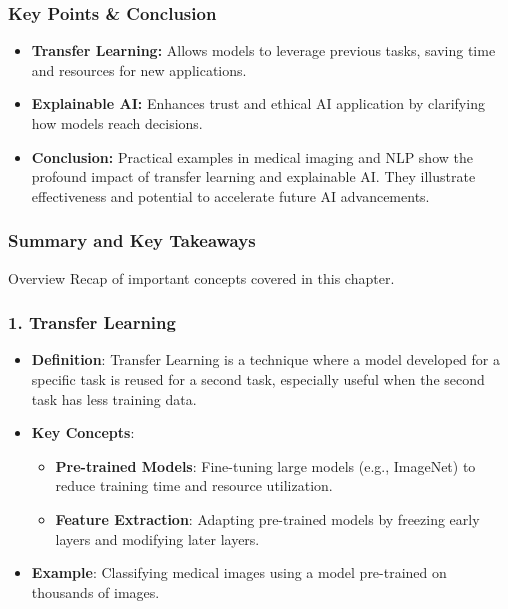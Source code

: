\documentclass[aspectratio=169]{beamer}
\begin{document}
\begin{frame}[fragile]
    \frametitle{Key Points & Conclusion}
    \begin{itemize}
        \item \textbf{Transfer Learning:} Allows models to leverage previous tasks, saving time and resources for new applications.
        
        \item \textbf{Explainable AI:} Enhances trust and ethical AI application by clarifying how models reach decisions.
        
        \item \textbf{Conclusion:} Practical examples in medical imaging and NLP show the profound impact of transfer learning and explainable AI. They illustrate effectiveness and potential to accelerate future AI advancements.
    \end{itemize}
\end{frame}

\begin{frame}
    \frametitle{Summary and Key Takeaways}
    \begin{block}{Overview}
        Recap of important concepts covered in this chapter.
    \end{block}
\end{frame}

\begin{frame}
    \frametitle{1. Transfer Learning}
    \begin{itemize}
        \item \textbf{Definition}: Transfer Learning is a technique where a model developed for a specific task is reused for a second task, especially useful when the second task has less training data.
        \item \textbf{Key Concepts}:
        \begin{itemize}
            \item \textbf{Pre-trained Models}: Fine-tuning large models (e.g., ImageNet) to reduce training time and resource utilization.
            \item \textbf{Feature Extraction}: Adapting pre-trained models by freezing early layers and modifying later layers.
        \end{itemize}
        \item \textbf{Example}: Classifying medical images using a model pre-trained on thousands of images.
    \end{itemize}
\end{frame}
\end{document}
